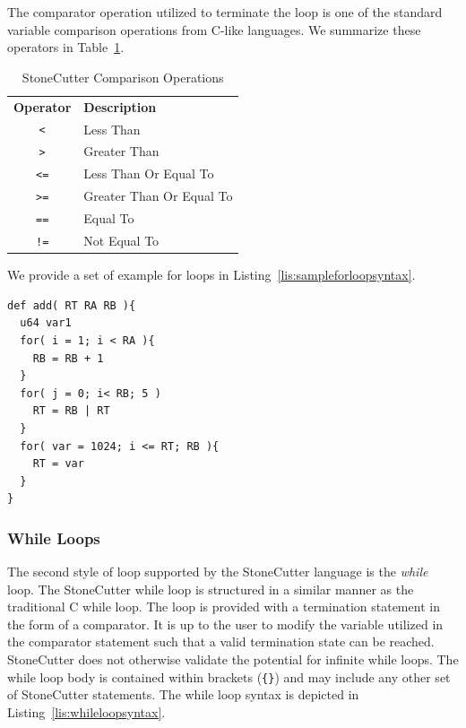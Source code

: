 \documentclass{article}
\begin{document}
The comparator operation utilized to terminate the loop is one of the standard 
variable comparison operations from C-like languages.  We summarize these operators in 
Table~\ref{tab:compreops}.  

\begin{table}[h]
\begin{center}
\caption{StoneCutter Comparison Operations}
\vspace{0.125in}
\label{tab:compreops}
\begin{tabular}{|c|l|}
\hline
\textbf{Operator} & \textbf{Description} \\
\texttt{<} & Less Than\\
\hline
\texttt{>} & Greater Than\\
\hline
\texttt{<=} & Less Than Or Equal To\\
\hline
\texttt{>=} & Greater Than Or Equal To\\
\hline
\texttt{==} & Equal To\\
\hline
\texttt{!=} & Not Equal To\\
\hline
\end{tabular}
\end{center}
\end{table}

We provide a set of example for loops in Listing~\ref{lis:sampleforloopsyntax}.  

\vspace{0.125in}
\begin{lstlisting}[frame=single,style=base,caption={Sample For Loop Syntax},captionpos=b,label={lis:sampleforloopsyntax}]
def add( RT RA RB ){
  u64 var1
  for( i = 1; i < RA ){
    RB = RB + 1
  }
  for( j = 0; i< RB; 5 )
    RT = RB | RT
  }
  for( var = 1024; i <= RT; RB ){
    RT = var
  }
}
\end{lstlisting}

\subsubsection{While Loops}
\label{sec:WhileLoops}

The second style of loop supported by the StoneCutter language is the \textit{while} loop.  The StoneCutter 
while loop is structured in a similar manner as the traditional C while loop.  The loop is provided with a 
termination statement in the form of a comparator.  It is up to the user to modify the variable utilized 
in the comparator statement such that a valid termination state can be reached.  StoneCutter does not otherwise 
validate the potential for infinite while loops.  The while loop body is contained within brackets 
(\texttt{\{\}}) and may include any other set of StoneCutter statements.  The while loop syntax is depicted in 
Listing~\ref{lis:whileloopsyntax}.  
\end{document}
